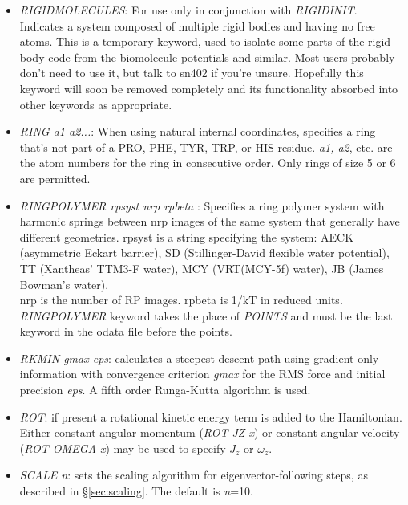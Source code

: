\documentclass[12pt,a4paper,dvips]{article}
\begin{document}
\begin{itemize}
\item {\it RIGIDMOLECULES\/}: For use only in conjunction with {\it RIGIDINIT}. Indicates a system composed of multiple rigid bodies and having no free atoms. This is a temporary keyword, used to isolate some parts of the rigid body code from the biomolecule potentials and similar. Most users probably don't need to use it, but talk to sn402 if you're unsure. Hopefully this keyword will soon be removed completely and its functionality absorbed into other keywords as appropriate.

\item {\it RING a1 a2...}: When using natural internal coordinates, specifies
  a ring that's not part of a PRO, PHE, TYR, TRP, or HIS residue. {\it a1,
  a2}, etc. are the atom numbers for the ring in consecutive order. Only rings
  of size 5 or 6 are permitted.

\item {\it RINGPOLYMER rpsyst nrp rpbeta }: Specifies a ring polymer system with harmonic springs between
  nrp images of the same system that generally have different geometries.
   rpsyst is a string specifying the system: AECK (asymmetric Eckart barrier), SD (Stillinger-David flexible water potential), TT (Xantheas' TTM3-F water), MCY 
   (VRT(MCY-5f) water), JB (James Bowman's water).\\
  nrp is the number of RP images.
  rpbeta is 1/kT in reduced units.
  {\it RINGPOLYMER} keyword takes the place of {\it POINTS} and must be the last
  keyword in the odata file before the points.
  
\item {\it RKMIN gmax eps\/}: calculates a steepest-descent path using gradient only
      information with convergence criterion {\it gmax\/} for the RMS force and initial
      precision {\it eps\/}. A fifth order Runga-Kutta algorithm is used.

\item {\it ROT\/}: if present a rotational kinetic energy term is
added to the Hamiltonian. Either constant angular momentum ({\it ROT JZ x\/}) or
constant angular velocity ({\it ROT OMEGA x\/}) may be used to specify $J_z$
or $\omega_z$.


\item {\it SCALE n\/}: sets the scaling algorithm for eigenvector-following
steps, as described in \S\ref{sec:scaling}. The default is {\it n\/}=10.


\end{itemize}
\end{document}
